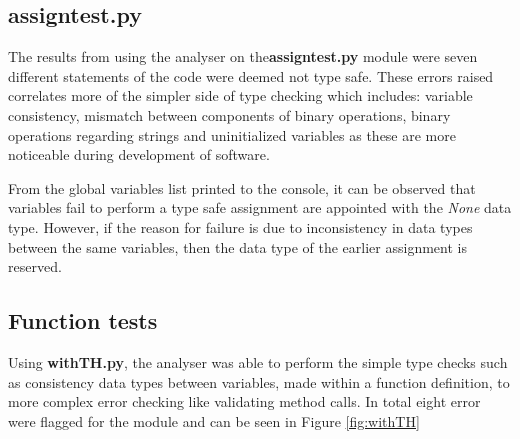 \documentclass{l4proj}
\begin{document}
\subsection{assign\textunderscore test.py}
The results from using the analyser on the\textbf{assign\textunderscore test.py} module were seven different statements of the code were deemed not type safe. These errors raised correlates more of the simpler side of type checking which includes: variable consistency, mismatch between components of binary operations, binary operations regarding strings and uninitialized variables as these are more noticeable during development of software.

From the global variables list printed to the console, it can be observed that variables fail to perform a type safe assignment are appointed with the \textit{None} data type. However, if the reason for failure is due to inconsistency in data types between the same variables, then the data type of the earlier assignment is reserved.

\subsection{Function tests}
Using \textbf{withTH.py}, the analyser was able to perform the simple type checks such as consistency data types between variables, made within a function definition, to more complex error checking like validating method calls. In total eight error were flagged for the module and can be seen in Figure \ref{fig:withTH}
\end{document}

